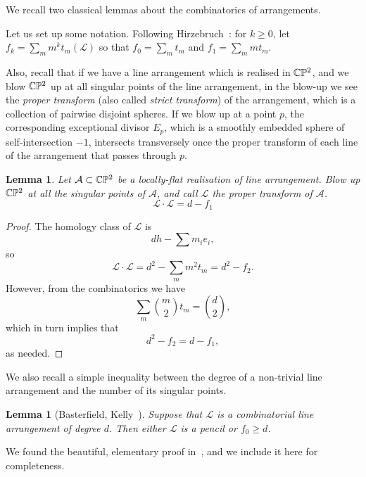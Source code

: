 \documentclass[a4paper,12pt, onesided]{amsart}
\newtheorem{lemma}[thm]{Lemma}
\theoremstyle{remark}
\numberwithin{figure}{section}
\numberwithin{equation}{section}
\newcommand{\CP}{\mathbb{CP}\vphantom{\mathbb{P}}^2}
\renewcommand{\L}{\mathcal{L}}
\newcommand{\A}{\mathcal{A}}
\begin{document}
We recall two classical lemmas about the combinatorics of arrangements.

Let us set up some notation.
Following Hirzebruch~\cite{Hirzebruch:1983}: for $k \ge 0$, let $f_k = \sum_m m^k t_m(\L)$ so that $f_0 = \sum_m t_m$ and $f_1 = \sum_m mt_m$.

Also, recall that if we have a line arrangement which is realised in $\CP$, and we blow $\CP$ up at all singular points of the line arrangement, in the blow-up we see the \emph{proper transform} (also called \emph{strict transform}) of the arrangement, which is a collection of pairwise disjoint spheres. If we blow up at a point $p$, the corresponding exceptional divisor $E_p$, which is a smoothly embedded sphere of self-intersection $-1$, intersects transversely once the proper transform of each line of the arrangement that passes through $p$.

\begin{lemma}\label{l:f1f2}
Let $\A \subset \CP$ be a locally-flat realisation of line arrangement.
Blow up $\CP$ at all the singular points of $\A$, and call $\L$ the proper transform of $\A$.
\[
\L \cdot \L = d - f_1
\]
\end{lemma}

\begin{proof}
The homology class of $\L$ is
\[
dh - \sum m_i e_i,
\]
so
\[
\L \cdot \L = d^2 - \sum_m m^2t_m = d^2-f_2.
\]
However, from the combinatorics we have
\[
\sum_m {m \choose 2} t_m = {d \choose 2},
\]
which in turn implies that 
\[
d^2 - f_2 = d - f_1,
\]
as needed.
\end{proof}

We also recall a simple inequality between the degree of a non-trivial line arrangement and the number of its singular points.

\begin{lemma}[Basterfield, Kelly~\cite{Basterfield-Kelly:1968}]\label{l:largef0}
Suppose that $\L$ is a combinatorial line arrangement of degree $d$.
Then either $\L$ is a pencil or $f_0 \ge d$.
\end{lemma}

We found the beautiful, elementary proof in~\cite{Grunbaum:1972}, and we include it here for completeness.
\end{document}
